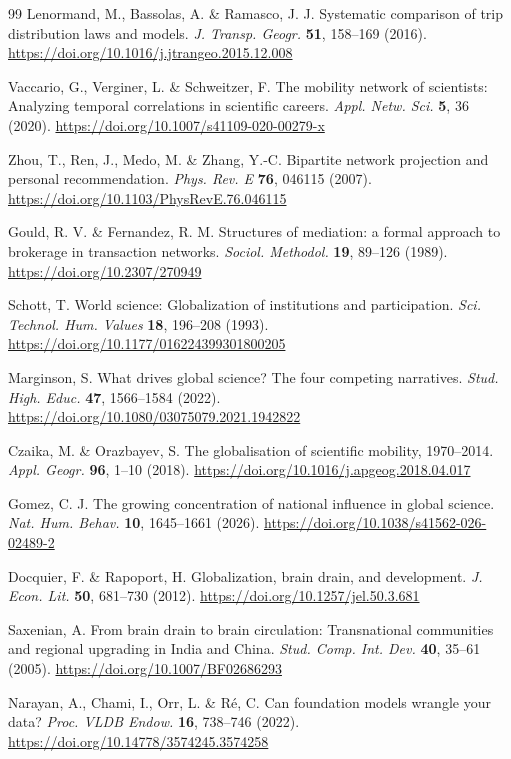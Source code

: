 \begin{thebibliography}{99}
Lenormand, M., Bassolas, A. \& Ramasco, J. J. Systematic comparison of trip distribution laws and models. \textit{J. Transp. Geogr.} \textbf{51}, 158--169 (2016). \url{https://doi.org/10.1016/j.jtrangeo.2015.12.008}

Vaccario, G., Verginer, L. \& Schweitzer, F. The mobility network of scientists: Analyzing temporal correlations in scientific careers. \textit{Appl. Netw. Sci.} \textbf{5}, 36 (2020). \url{https://doi.org/10.1007/s41109-020-00279-x}

Zhou, T., Ren, J., Medo, M. \& Zhang, Y.-C. Bipartite network projection and personal recommendation. \textit{Phys. Rev. E} \textbf{76}, 046115 (2007). \url{https://doi.org/10.1103/PhysRevE.76.046115}

Gould, R. V. \& Fernandez, R. M. Structures of mediation: a formal approach to brokerage in transaction networks. \textit{Sociol. Methodol.} \textbf{19}, 89--126 (1989). \url{https://doi.org/10.2307/270949}

Schott, T. World science: Globalization of institutions and participation. \textit{Sci. Technol. Hum. Values} \textbf{18}, 196--208 (1993). \url{https://doi.org/10.1177/016224399301800205}

Marginson, S. What drives global science? The four competing narratives. \textit{Stud. High. Educ.} \textbf{47}, 1566--1584 (2022). \url{https://doi.org/10.1080/03075079.2021.1942822}

Czaika, M. \& Orazbayev, S. The globalisation of scientific mobility, 1970--2014. \textit{Appl. Geogr.} \textbf{96}, 1--10 (2018). \url{https://doi.org/10.1016/j.apgeog.2018.04.017}

Gomez, C. J. The growing concentration of national influence in global science. \textit{Nat. Hum. Behav.} \textbf{10}, 1645--1661 (2026). \url{https://doi.org/10.1038/s41562-026-02489-2}

Docquier, F. \& Rapoport, H. Globalization, brain drain, and development. \textit{J. Econ. Lit.} \textbf{50}, 681--730 (2012). \url{https://doi.org/10.1257/jel.50.3.681}

Saxenian, A. From brain drain to brain circulation: Transnational communities and regional upgrading in India and China. \textit{Stud. Comp. Int. Dev.} \textbf{40}, 35--61 (2005). \url{https://doi.org/10.1007/BF02686293}

Narayan, A., Chami, I., Orr, L. \& R{\'e}, C. Can foundation models wrangle your data? \textit{Proc. VLDB Endow.} \textbf{16}, 738--746 (2022). \url{https://doi.org/10.14778/3574245.3574258}


\end{thebibliography}
